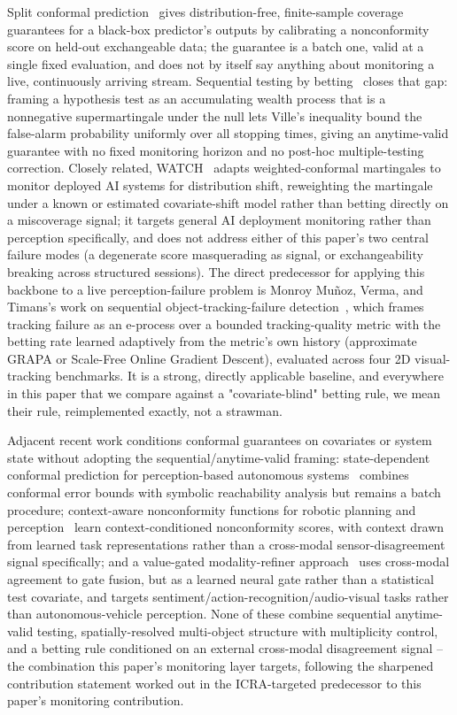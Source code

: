 Split conformal prediction~\cite{VovkGammermanShafer2005,Lei2018JASA} gives distribution-free, finite-sample coverage guarantees for a black-box predictor's outputs by calibrating a nonconformity score on held-out exchangeable data; the guarantee is a batch one, valid at a single fixed evaluation, and does not by itself say anything about monitoring a live, continuously arriving stream. Sequential testing by betting~\cite{Ramdas2023GameTheoretic,WaudbySmithRamdas2024JRSSB} closes that gap: framing a hypothesis test as an accumulating wealth process that is a nonnegative supermartingale under the null lets Ville's inequality bound the false-alarm probability uniformly over all stopping times, giving an anytime-valid guarantee with no fixed monitoring horizon and no post-hoc multiple-testing correction. Closely related, WATCH~\cite{Prinster2025WATCH} adapts weighted-conformal martingales to monitor deployed AI systems for distribution shift, reweighting the martingale under a known or estimated covariate-shift model rather than betting directly on a miscoverage signal; it targets general AI deployment monitoring rather than perception specifically, and does not address either of this paper's two central failure modes (a degenerate score masquerading as signal, or exchangeability breaking across structured sessions). The direct predecessor for applying this backbone to a live perception-failure problem is Monroy Mu\~noz, Verma, and Timans's work on sequential object-tracking-failure detection~\cite{MonroyMunoz2026WACV}, which frames tracking failure as an e-process over a bounded tracking-quality metric with the betting rate learned adaptively from the metric's own history (approximate GRAPA or Scale-Free Online Gradient Descent), evaluated across four 2D visual-tracking benchmarks. It is a strong, directly applicable baseline, and everywhere in this paper that we compare against a "covariate-blind" betting rule, we mean their rule, reimplemented exactly, not a strawman.

Adjacent recent work conditions conformal guarantees on covariates or system state without adopting the sequential/anytime-valid framing: state-dependent conformal prediction for perception-based autonomous systems~\cite{Geng2025StateDependent} combines conformal error bounds with symbolic reachability analysis but remains a batch procedure; context-aware nonconformity functions for robotic planning and perception~\cite{Kumar2025ContextAware} learn context-conditioned nonconformity scores, with context drawn from learned task representations rather than a cross-modal sensor-disagreement signal specifically; and a value-gated modality-refiner approach~\cite{Liu2026ValueGated} uses cross-modal agreement to gate fusion, but as a learned neural gate rather than a statistical test covariate, and targets sentiment/action-recognition/audio-visual tasks rather than autonomous-vehicle perception. None of these combine sequential anytime-valid testing, spatially-resolved multi-object structure with multiplicity control, and a betting rule conditioned on an external cross-modal disagreement signal -- the combination this paper's monitoring layer targets, following the sharpened contribution statement worked out in the ICRA-targeted predecessor to this paper's monitoring contribution.

